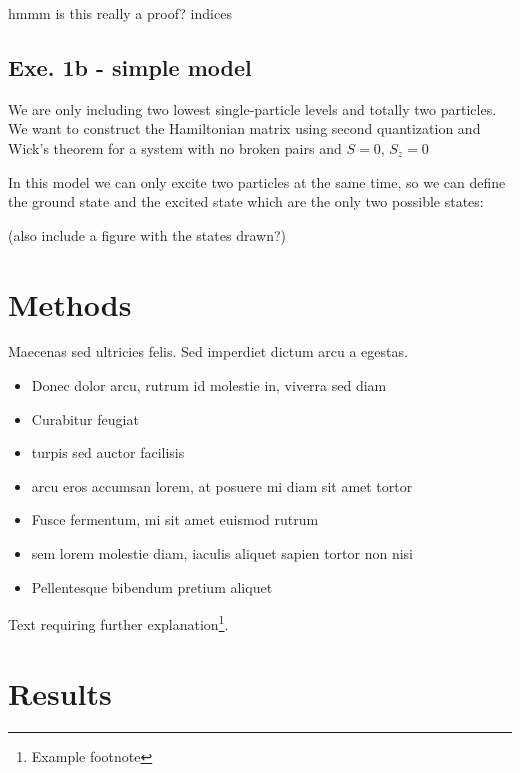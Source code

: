 \documentclass[twoside]{article}
\begin{document}
hmmm is this really a proof? indices

\subsection{ Exe. 1b - simple model}

We are only including two lowest single-particle levels and totally two particles.  We want to construct the Hamiltonian matrix using second quantization and Wick’s theorem for a system with no broken pairs and $S=0$, $S_z=0$

In this model we can only excite two particles at the same time, so we can define the ground state and the excited state which are the only two possible states:

(also include a figure with the states drawn?)






\section{Methods}

Maecenas sed ultricies felis. Sed imperdiet dictum arcu a egestas. 
\begin{itemize}
\item Donec dolor arcu, rutrum id molestie in, viverra sed diam
\item Curabitur feugiat
\item turpis sed auctor facilisis
\item arcu eros accumsan lorem, at posuere mi diam sit amet tortor
\item Fusce fermentum, mi sit amet euismod rutrum
\item sem lorem molestie diam, iaculis aliquet sapien tortor non nisi
\item Pellentesque bibendum pretium aliquet
\end{itemize}
\blindtext %

Text requiring further explanation\footnote{Example footnote}.


\section{Results}
\end{document}
